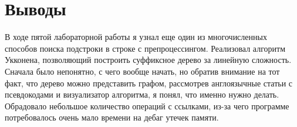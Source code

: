 
\section{Выводы}
В ходе пятой лабораторной работы я узнал еще один из многочисленных способов поиска подстроки в строке с препроцессингом. Реализовал алгоритм Укконена, позволяющий построить суффиксное дерево за линейную сложность. Сначала было непонятно, с чего вообще начать, но обратив внимание на тот факт, что дерево можно представить графом, рассмотрев англоязычные статьи с псевдокодами и визуализатор алгоритма, я понял, что именно нужно делать. Обрадовало небольшое количество операций с ссылками, из-за чего программе потребовалось очень мало времени на дебаг утечек памяти. 
\pagebreak

